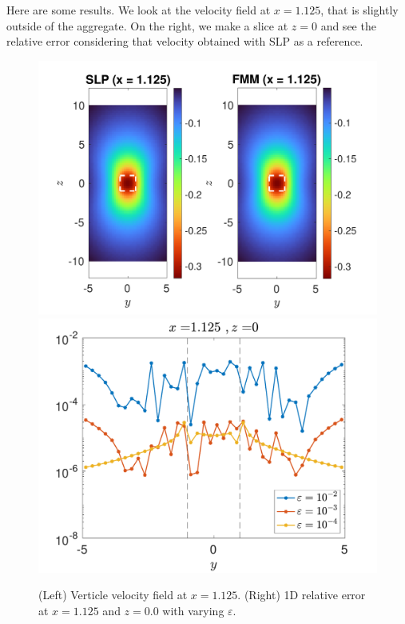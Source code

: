 Here are some results. We look at the velocity field at $x = 1.125$, that is slightly outside of the aggregate. On the right, we make a slice at $z = 0$ and see the relative error considering that velocity obtained with SLP as a reference. 
\begin{figure}[ht]
	\begin{center}
		\includegraphics[scale=0.44]{./figures/fig_vel_NC1_eps1e-4}
		\includegraphics[scale=0.42]{./figures/fig_1Derr_NC1_eps1e-4}
	\caption{(Left) Verticle velocity field at $x = 1.125$. (Right) 1D relative error at $x = 1.125$ and $z = 0.0$ with varying $\varepsilon$.}
	\label{fig_vel_NC1_eps1e-4}
\end{center}
\end{figure}
